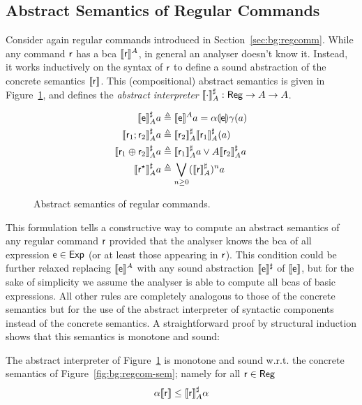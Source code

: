 \subsection{Abstract Semantics of Regular Commands}
Consider again regular commands introduced in Section~\ref{sec:bg:regcomm}. While any command $\mathsf{r}$ has a bca $\llbracket\mathsf{r}\rrbracket^{A}$, in general an analyser doesn't know it. Instead, it works inductively on the syntax of $\mathsf{r}$ to define a sound abstraction of the concrete semantics $\llbracket\mathsf{r}\rrbracket$. This (compositional) abstract semantics is given in Figure~\ref{fig:bg:regcom-abs-sem}, and defines the \emph{abstract interpreter} $\llbracket\cdot\rrbracket^{\sharp}_{A} : \mathsf{Reg} \rightarrow A \rightarrow A$.
\begin{figure}[t]
	\begin{align*}
		\llbracket\mathsf{e}\rrbracket^{\sharp}_{A} a                    & \triangleq \llbracket\mathsf{e}\rrbracket^{A} a = \alpha \llparenthesis\mathsf{e}\rrparenthesis \gamma (a)               \\
		\llbracket\mathsf{r}_1 ; \mathsf{r}_2\rrbracket^{\sharp}_{A} a        & \triangleq \llbracket\mathsf{r}_2\rrbracket^{\sharp}_{A} \llbracket\mathsf{r}_1\rrbracket^{\sharp}_{A} (a)        \\
		\llbracket\mathsf{r}_1 \oplus \mathsf{r}_2\rrbracket^{\sharp}_{A} a & \triangleq \llbracket\mathsf{r}_1\rrbracket^{\sharp}_{A} a \vee A \llbracket\mathsf{r}_2\rrbracket^{\sharp}_{A} a \\
		\llbracket\mathsf{r}^\star\rrbracket^{\sharp}_{A} a             & \triangleq \bigvee_{n \ge 0}  (\llbracket\mathsf{r}\rrbracket^{\sharp}_{A})^n a
	\end{align*}
	\caption{Abstract semantics of regular commands.}
	\label{fig:bg:regcom-abs-sem}
\end{figure}
This formulation tells a constructive way to compute an abstract semantics of any regular command $\mathsf{r}$ provided that the analyser knows the bca of all expression $\mathsf{e} \in \mathsf{Exp}$ (or at least those appearing in $\mathsf{r}$). This condition could be further relaxed replacing $\llbracket\mathsf{e}\rrbracket^{A}$ with any sound abstraction $\llbracket\mathsf{e}\rrbracket^{\sharp}$ of $\llbracket\mathsf{e}\rrbracket$, but for the sake of simplicity we assume the analyser is able to compute all bcas of basic expressions. All other rules are completely analogous to those of the concrete semantics but for the use of the abstract interpreter of syntactic components instead of the concrete semantics.
A straightforward proof by structural induction shows that this semantics is monotone and sound:
\begin{prop}
	The abstract interpreter of Figure~\ref{fig:bg:regcom-abs-sem} is monotone and sound w.r.t. the concrete semantics of Figure~\ref{fig:bg:regcom-sem}; namely for all $\mathsf{r} \in \mathsf{Reg}$
	\[
	\alpha \llbracket\mathsf{r}\rrbracket \le \llbracket\mathsf{r}\rrbracket^{\sharp}_A \alpha
	\]
\end{prop}
